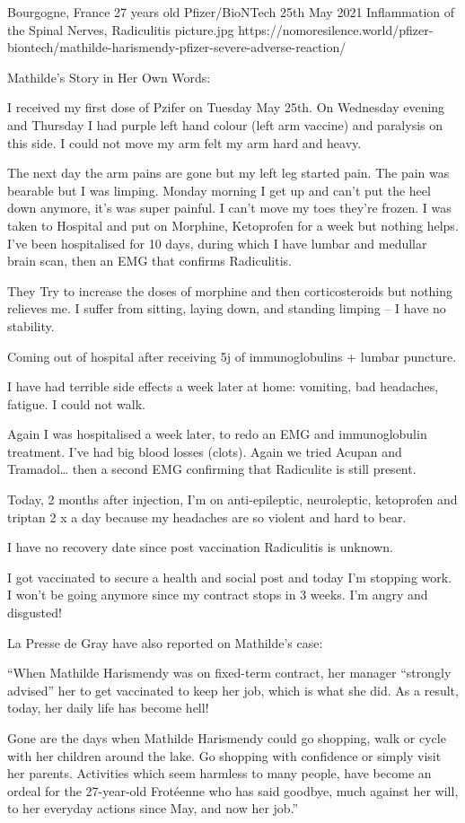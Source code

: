 {Bourgogne, France}
{27 years old}
{Pfizer/BioNTech}
{25th May 2021}
{Inflammation of the Spinal Nerves, Radiculitis}
{picture.jpg}
{https://nomoresilence.world/pfizer-biontech/mathilde-harismendy-pfizer-severe-adverse-reaction/}
{

Mathilde’s Story in Her Own Words:

I received my first dose of Pzifer on Tuesday May 25th. On Wednesday evening and
Thursday I had purple left hand colour (left arm vaccine) and paralysis on this
side. I could not move my arm felt my arm hard and heavy.

The next day the arm pains are gone but my left leg started pain. The pain was
bearable but I was limping. Monday morning I get up and can’t put the heel down
anymore, it’s was super painful. I can’t move my toes they’re frozen.  I was
taken to Hospital and put on Morphine, Ketoprofen for a week but nothing
helps. I’ve been hospitalised for 10 days, during which I have lumbar and
medullar brain scan, then an EMG that confirms Radiculitis.

They Try to increase the doses of morphine and then corticosteroids but nothing
relieves me. I suffer from sitting, laying down, and standing limping – I have
no stability.

Coming out of hospital after receiving 5j of immunoglobulins + lumbar puncture.

I have had terrible side effects a week later at home: vomiting, bad headaches,
fatigue. I could not walk.

Again I was hospitalised a week later, to redo an EMG and immunoglobulin
treatment. I’ve had big blood losses (clots). Again we tried Acupan and
Tramadol… then a second EMG confirming that Radiculite is still present.

Today, 2 months after injection, I’m on anti-epileptic, neuroleptic, ketoprofen
and triptan 2 x a day because my headaches are so violent and hard to bear.

I have no recovery date since post vaccination Radiculitis is unknown.

I got vaccinated to secure a health and social post and today I’m stopping
work. I won’t be going anymore since my contract stops in 3 weeks. I’m angry and
disgusted!

La Presse de Gray have also reported on Mathilde’s case:

“When Mathilde Harismendy was on fixed-term contract, her manager “strongly
advised” her to get vaccinated to keep her job, which is what she did. As a
result, today, her daily life has become hell!

Gone are the days when Mathilde Harismendy could go shopping, walk or cycle with
her children around the lake. Go shopping with confidence or simply visit her
parents. Activities which seem harmless to many people, have become an ordeal
for the 27-year-old Frotéenne who has said goodbye, much against her will, to
her everyday actions since May, and now her job.”

}
